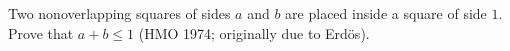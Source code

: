 Two nonoverlapping squares of sides $a$ and $b$ are placed inside a square of side $1$. Prove that $a + b \leq 1$ (HMO 1974; originally due to Erdös).
